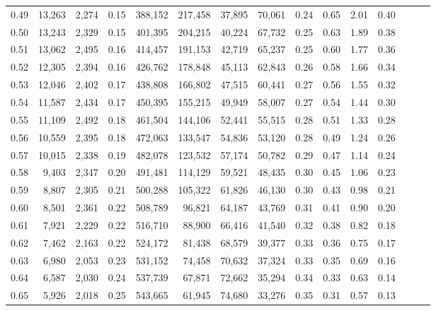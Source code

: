 \begin{tabular}{rrrrrrrrrrrrrrr}
0.49 &  13,263 &  2,274 &  0.15 &  388,152 &  217,458 &   37,895 &   70,061 &  0.24 &  0.65 &  2.01 &      0.40 \\
0.50 &  13,243 &  2,329 &  0.15 &  401,395 &  204,215 &   40,224 &   67,732 &  0.25 &  0.63 &  1.89 &      0.38 \\
0.51 &  13,062 &  2,495 &  0.16 &  414,457 &  191,153 &   42,719 &   65,237 &  0.25 &  0.60 &  1.77 &      0.36 \\
0.52 &  12,305 &  2,394 &  0.16 &  426,762 &  178,848 &   45,113 &   62,843 &  0.26 &  0.58 &  1.66 &      0.34 \\
0.53 &  12,046 &  2,402 &  0.17 &  438,808 &  166,802 &   47,515 &   60,441 &  0.27 &  0.56 &  1.55 &      0.32 \\
0.54 &  11,587 &  2,434 &  0.17 &  450,395 &  155,215 &   49,949 &   58,007 &  0.27 &  0.54 &  1.44 &      0.30 \\
0.55 &  11,109 &  2,492 &  0.18 &  461,504 &  144,106 &   52,441 &   55,515 &  0.28 &  0.51 &  1.33 &      0.28 \\
0.56 &  10,559 &  2,395 &  0.18 &  472,063 &  133,547 &   54,836 &   53,120 &  0.28 &  0.49 &  1.24 &      0.26 \\
0.57 &  10,015 &  2,338 &  0.19 &  482,078 &  123,532 &   57,174 &   50,782 &  0.29 &  0.47 &  1.14 &      0.24 \\
0.58 &   9,403 &  2,347 &  0.20 &  491,481 &  114,129 &   59,521 &   48,435 &  0.30 &  0.45 &  1.06 &      0.23 \\
0.59 &   8,807 &  2,305 &  0.21 &  500,288 &  105,322 &   61,826 &   46,130 &  0.30 &  0.43 &  0.98 &      0.21 \\
0.60 &   8,501 &  2,361 &  0.22 &  508,789 &   96,821 &   64,187 &   43,769 &  0.31 &  0.41 &  0.90 &      0.20 \\
0.61 &   7,921 &  2,229 &  0.22 &  516,710 &   88,900 &   66,416 &   41,540 &  0.32 &  0.38 &  0.82 &      0.18 \\
0.62 &   7,462 &  2,163 &  0.22 &  524,172 &   81,438 &   68,579 &   39,377 &  0.33 &  0.36 &  0.75 &      0.17 \\
0.63 &   6,980 &  2,053 &  0.23 &  531,152 &   74,458 &   70,632 &   37,324 &  0.33 &  0.35 &  0.69 &      0.16 \\
0.64 &   6,587 &  2,030 &  0.24 &  537,739 &   67,871 &   72,662 &   35,294 &  0.34 &  0.33 &  0.63 &      0.14 \\
0.65 &   5,926 &  2,018 &  0.25 &  543,665 &   61,945 &   74,680 &   33,276 &  0.35 &  0.31 &  0.57 &      0.13 \\

\end{tabular}
